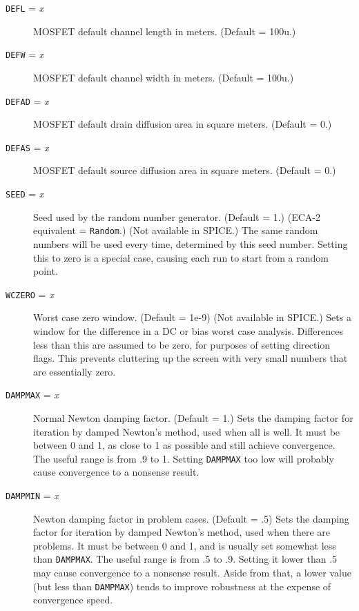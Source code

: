 \begin{description}
\item[{\tt DEFL} = {\it x}] MOSFET default channel length in 
meters.  (Default = 100u.)

\item[{\tt DEFW} = {\it x}]  MOSFET default channel width in 
meters.  (Default = 100u.)

\item[{\tt DEFAD} = {\it x}] MOSFET default drain diffusion area
in square meters.  (Default = 0.)

\item[{\tt DEFAS} = {\it x}]  MOSFET default source diffusion area
in square meters.  (Default = 0.)

\item[{\tt SEED} = {\it x}] Seed used by the random number
generator.  (Default = 1.)  (ECA-2 equivalent = {\tt Random}.)
(Not available in SPICE.)  The same random numbers will be used
every time, determined by this seed number.  Setting this to
zero is a special case, causing each run to start from a random
point.

\item[{\tt WCZERO} = {\it x}] Worst case zero window.  (Default
= 1e-9) (Not available in SPICE.)  Sets a window for the
difference in a DC or bias worst case analysis.  Differences
less than this are assumed to be zero, for purposes of setting
direction flags.  This prevents cluttering up the screen with
very small numbers that are essentially zero.
        
\item[{\tt DAMPMAX} = {\it x}] Normal Newton damping factor.
(Default = 1.)  Sets the damping factor for iteration by damped
Newton's method, used when all is well.  It must be between 0 and 1,
as close to 1 as possible and still achieve convergence.  The useful
range is from .9 to 1.  Setting {\tt DAMPMAX} too low will probably cause
convergence to a nonsense result.

\item[{\tt DAMPMIN} = {\it x}] Newton damping factor in problem
cases.  (Default = .5)  Sets the damping factor for iteration by
damped Newton's method, used when there are problems.  It must be
between 0 and 1, and is usually set somewhat less than {\tt DAMPMAX}.
The useful range is from .5 to .9.  Setting it lower than .5 may
cause convergence to a nonsense result.  Aside from that, a lower
value (but less than {\tt DAMPMAX}) tends to improve robustness at
the expense of convergence speed.


\end{description}
